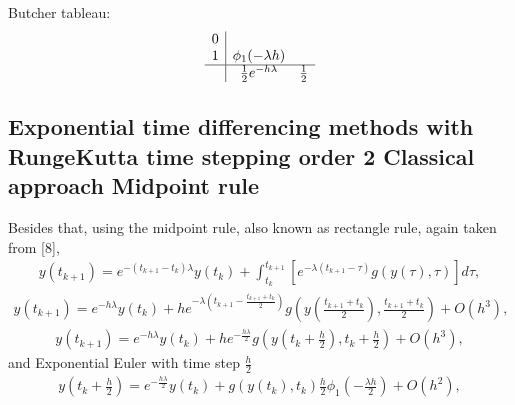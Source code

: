 \documentclass[letterpaper,10pt,english]{jupyterBook}
\begin{document}
\sphinxAtStartPar
Butcher tableau:
\begin{equation*}
\begin{split}
\begin{array}
{c|cc}
0\\
1 & \phi_1(-\lambda h)\\
\hline
& \frac{1}{2} e^{-h \lambda} & \frac{1}{2}
\end{array}
\end{split}
\end{equation*}

\subsection{Exponential time differencing methods with Runge\sphinxhyphen{}Kutta time stepping \sphinxhyphen{} order 2 \sphinxhyphen{} Classical approach \sphinxhyphen{} Midpoint rule}
\label{\detokenize{appendix:exponential-time-differencing-methods-with-runge-kutta-time-stepping-order-2-classical-approach-midpoint-rule}}
\sphinxAtStartPar
Besides that, using the midpoint rule, also known as rectangle rule, again taken from {[}8{]},
\begin{equation*}
\begin{split}
y(t_{k+1}) = e^{-(t_{k+1}-t_k) \lambda}y(t_k) + \int_{t_k}^{t_{k+1}} [e^{-\lambda(t_{k+1}-\tau)} g(y(\tau), \tau)] d\tau,
\end{split}
\end{equation*}\begin{equation*}
\begin{split}
y(t_{k+1}) = e^{-h\lambda}y(t_k) + h e^{-\lambda\left(t_{k+1}-\frac{t_{k+1}+t_k}{2}\right)} g\left(y\left(\frac{t_{k+1}+t_k}{2}\right), \frac{t_{k+1}+t_k}{2}\right) + O(h^3),
\end{split}
\end{equation*}\begin{equation*}
\begin{split}
y(t_{k+1}) = e^{-h\lambda}y(t_k) + h e^{- \frac{h\lambda}{2}} g\left(y\left(t_k + \frac{h}{2}\right), t_k+\frac{h}{2}\right) + O(h^3),
\end{split}
\end{equation*}
\sphinxAtStartPar
and Exponential Euler with time step \(\frac{h}{2}\)
\begin{equation*}
\begin{split}
y\left(t_k + \frac{h}{2}\right) = e^{-\frac{h \lambda}{2}}y(t_k) + g(y(t_k), t_k) \frac{h}{2} \phi_1\left( -\frac{\lambda h}{2} \right) + O(h^2),
\end{split}
\end{equation*}
\end{document}
